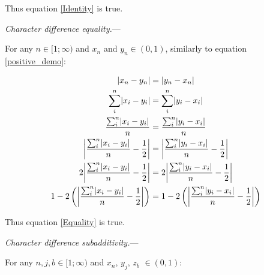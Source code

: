 \documentclass[12pt,letterpaper]{article}
\DeclarePairedDelimiter\abs{\lvert}{\rvert}%
\renewcommand{\subsection}[1]{%
\bigskip
\begin{center}
\begin{large}
\normalfont\itshape #1
\end{large}
\end{center}}
\renewcommand{\subsection}[1]{%
\vspace{2ex}
\noindent
\textit{#1.}---}
\begin{document}
Thus equation \ref{Identity} is true.

\subsection{Character difference equality}

For any $n \in [1;\infty)$ and $x_{n}$ and $y_{n} \in (0,1)$, similarly to equation \ref{positive_demo}:

\begin{equation}
    \label{equality_demo}
    \begin{aligned}
    \abs{x_{n}-y_{n}} &= \abs{y_{n}-x_{n}}\\
    \sum_{i}^{n}\abs{x_{i}-y_{i}} &= \sum_{i}^{n}\abs{y_{i}-x_{i}}\\
    \frac{\sum_{i}^{n}\abs{x_{i}-y_{i}}}{n} &= \frac{\sum_{i}^{n}\abs{y_{i}-x_{i}}}{n}\\
    \abs*{\frac{\sum_{i}^{n}\abs{x_{i}-y_{i}}}{n}-\frac{1}{2}} &= \abs*{\frac{\sum_{i}^{n}\abs{y_{i}-x_{i}}}{n}-\frac{1}{2}}\\
    2\abs*{\frac{\sum_{i}^{n}\abs{x_{i}-y_{i}}}{n}-\frac{1}{2}} &= 2\abs*{\frac{\sum_{i}^{n}\abs{y_{i}-x_{i}}}{n}-\frac{1}{2}}\\
    1 - 2\left(\abs*{\frac{\sum_{i}^{n}\abs{x_{i}-y_{i}}}{n}-\frac{1}{2}}\right) &= 1 - 2\left(\abs*{\frac{\sum_{i}^{n}\abs{y_{i}-x_{i}}}{n}-\frac{1}{2}}\right)\\
    \end{aligned}
\end{equation}

Thus equation \ref{Equality} is true.

\subsection{Character difference subadditivity}

For any $n, j, b \in [1;\infty)$ and $x_{n}$, $y_{j}$, $z_{b}$ $\in (0,1)$:
\end{document}
